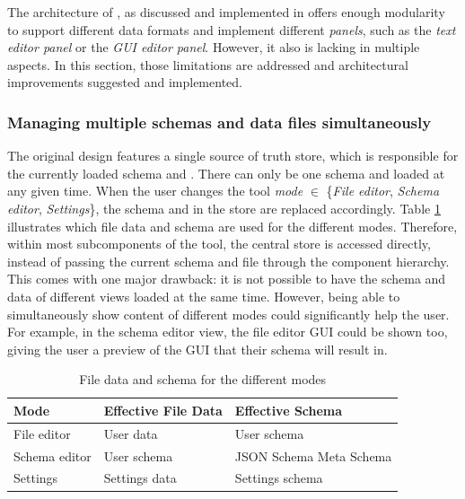 The architecture of \toolname{}, as discussed and implemented in \cite{metaconfigurator} offers enough modularity to support different data formats and implement different \textit{panels}, such as the \textit{text editor panel} or the \textit{GUI editor panel}. 
However, it also is lacking in multiple aspects.
In this section, those limitations are addressed and architectural improvements suggested and implemented.

\subsubsection{Managing multiple schemas and data files simultaneously}
The original design features a single source of truth store, which is responsible for the currently loaded schema and \cfgfile{}. 
There can only be one schema and \cfgfile{} loaded at any given time.
When the user changes the tool \textit{mode} $\in$ \{\textit{File editor}, \textit{Schema editor}, \textit{Settings}\}, the schema and \cfgfile{} in the store are replaced accordingly.
Table \ref{tab:schema_and_file_data_by_mode} illustrates which file data and schema are used for the different modes.
Therefore, within most subcomponents of the tool, the central store is accessed directly, instead of passing the current schema and file through the component hierarchy. 
This comes with one major drawback: it is not possible to have the schema and data of different views loaded at the same time.
However, being able to simultaneously show content of different modes could significantly help the user.
For example, in the schema editor view, the file editor GUI could be shown too, giving the user a preview of the GUI that their schema will result in.
\begin{table}[!t]
\caption{File data and schema for the different modes}
\label{tab:schema_and_file_data_by_mode}
\centering
\begin{tabular}{lll}
\toprule
\textbf{Mode} & \textbf{Effective File Data} & \textbf{Effective Schema} \\
\midrule
File editor   & User data                    & User schema               \\
Schema editor & User schema                  & JSON Schema Meta Schema          \\
Settings      & Settings data                & Settings schema           \\
\bottomrule
\end{tabular}
\end{table}

